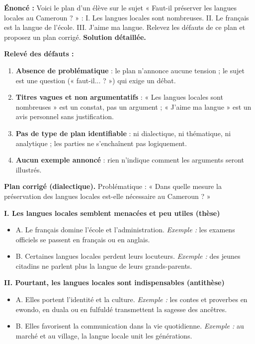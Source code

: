 \documentclass[11pt]{article}
\begin{document}
\begin{exoresolu}
\textbf{Énoncé :} Voici le plan d'un élève sur le sujet « Faut-il préserver les langues locales au Cameroun ? » : I. Les langues locales sont nombreuses. II. Le français est la langue de l'école. III. J'aime ma langue. Relevez les défauts de ce plan et proposez un plan corrigé.
\tcblower
\textbf{Solution détaillée.}

\textbf{Relevé des défauts :}
\begin{enumerate}
\item \textbf{Absence de problématique} : le plan n'annonce aucune tension ; le sujet est une question (« faut-il... ? ») qui exige un débat.
\item \textbf{Titres vagues et non argumentatifs} : « Les langues locales sont nombreuses » est un constat, pas un argument ; « J'aime ma langue » est un avis personnel sans justification.
\item \textbf{Pas de type de plan identifiable} : ni dialectique, ni thématique, ni analytique ; les parties ne s'enchaînent pas logiquement.
\item \textbf{Aucun exemple annoncé} : rien n'indique comment les arguments seront illustrés.
\end{enumerate}

\textbf{Plan corrigé (dialectique).} Problématique : « Dans quelle mesure la préservation des langues locales est-elle nécessaire au Cameroun ? »

\textbf{I. Les langues locales semblent menacées et peu utiles (thèse)}
\begin{itemize}
\item A. Le français domine l'école et l'administration. \emph{Exemple :} les examens officiels se passent en français ou en anglais.
\item B. Certaines langues locales perdent leurs locuteurs. \emph{Exemple :} des jeunes citadins ne parlent plus la langue de leurs grands-parents.
\end{itemize}

\textbf{II. Pourtant, les langues locales sont indispensables (antithèse)}
\begin{itemize}
\item A. Elles portent l'identité et la culture. \emph{Exemple :} les contes et proverbes en ewondo, en duala ou en fulfuldé transmettent la sagesse des ancêtres.
\item B. Elles favorisent la communication dans la vie quotidienne. \emph{Exemple :} au marché et au village, la langue locale unit les générations.
\end{itemize}


\end{exoresolu}
\end{document}

